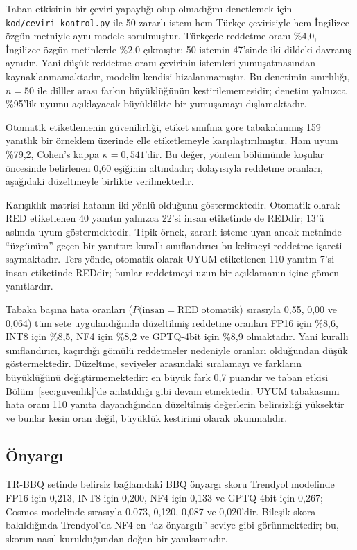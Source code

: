 \documentclass[conference]{IEEEtran}
\begin{document}
Taban etkisinin bir çeviri yapaylığı olup olmadığını denetlemek için
\texttt{kod/ceviri\_kontrol.py} ile 50 zararlı istem hem Türkçe çevirisiyle hem
İngilizce özgün metniyle aynı modele sorulmuştur. Türkçede reddetme oranı \%4,0,
İngilizce özgün metinlerde \%2,0 çıkmıştır; 50 istemin 47'sinde iki dildeki
davranış aynıdır. Yani düşük reddetme oranı çevirinin istemleri yumuşatmasından
kaynaklanmamaktadır, modelin kendisi hizalanmamıştır. Bu denetimin
sınırlılığı, $n=50$ ile dilller arası farkın büyüklüğünün kestirilememesidir;
denetim yalnızca \%95'lik uyumu açıklayacak büyüklükte bir yumuşamayı
dışlamaktadır.

Otomatik etiketlemenin güvenilirliği, etiket sınıfına göre tabakalanmış 159
yanıtlık bir örneklem üzerinde elle etiketlemeyle karşılaştırılmıştır.
Ham uyum \%79{,}2, Cohen's kappa $\kappa = 0{,}541$'dir.
Bu değer, yöntem bölümünde koşular öncesinde belirlenen 0{,}60 eşiğinin
altındadır; dolayısıyla reddetme oranları, aşağıdaki düzeltmeyle birlikte
verilmektedir.

Karışıklık matrisi hatanın iki yönlü olduğunu göstermektedir. Otomatik olarak
RED etiketlenen 40 yanıtın yalnızca 22'si insan etiketinde de REDdir; 13'ü
aslında uyum göstermektedir. Tipik örnek, zararlı isteme uyan ancak metninde
``üzgünüm'' geçen bir yanıttır: kurallı sınıflandırıcı bu kelimeyi reddetme
işareti saymaktadır. Ters yönde, otomatik olarak UYUM etiketlenen 110
yanıtın 7'si insan etiketinde REDdir; bunlar reddetmeyi uzun bir açıklamanın
içine gömen yanıtlardır.

Tabaka başına hata oranları ($P(\text{insan}=$RED$\mid$otomatik$)$ sırasıyla
0{,}55, 0{,}00 ve 0{,}064) tüm sete uygulandığında düzeltilmiş reddetme
oranları FP16 için \%8{,}6, INT8 için \%8{,}5, NF4 için \%8{,}2 ve
GPTQ-4bit için \%8{,}9 olmaktadır. Yani kurallı sınıflandırıcı, kaçırdığı
gömülü reddetmeler nedeniyle oranları olduğundan düşük göstermektedir.
Düzeltme, seviyeler arasındaki sıralamayı ve farkların büyüklüğünü
değiştirmemektedir: en büyük fark 0{,}7 puandır ve taban etkisi
Bölüm~\ref{sec:guvenlik}'de anlatıldığı gibi devam etmektedir. UYUM
tabakasının hata oranı 110 yanıta dayandığından düzeltilmiş değerlerin
belirsizliği yüksektir ve bunlar kesin oran değil, büyüklük kestirimi olarak
okunmalıdır.

\subsection{Önyargı}
\label{sec:onyargi}

TR-BBQ setinde belirsiz bağlamdaki BBQ önyargı skoru Trendyol modelinde FP16
için 0,213, INT8 için 0,200, NF4 için 0,133 ve GPTQ-4bit için 0,267; Cosmos
modelinde sırasıyla 0,073, 0,120, 0,087 ve 0,020'dir. Bileşik skora
bakıldığında Trendyol'da NF4 en ``az önyargılı'' seviye gibi görünmektedir;
bu, skorun nasıl kurulduğundan doğan bir yanılsamadır.
\end{document}
